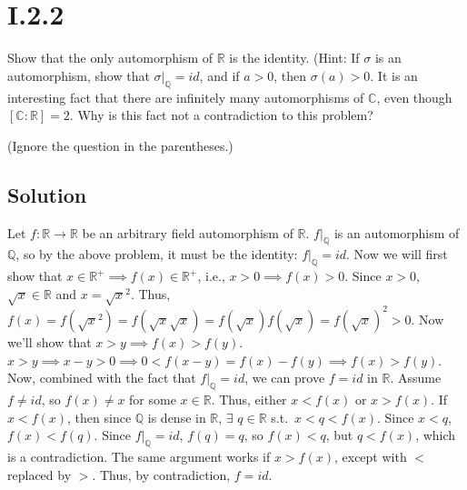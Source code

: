 \documentclass[fleqn]{article}
\begin{document}
    \section{I.2.2}
    Show that the only automorphism of $\mathbb{R}$ is the identity.  (Hint: If $\sigma$ is an automorphism, show that $\sigma \rvert_\mathbb{Q} = id$, and if $a > 0$, then $\sigma(a) > 0$.  It is an interesting fact that there are infinitely many automorphisms of $\mathbb{C}$, even though $[\mathbb{C} : \mathbb{R}] = 2$.  Why is this fact not a contradiction to this problem?
    
    (Ignore the question in the parentheses.)
        
        \subsection{Solution}
        Let $f: \mathbb{R} \to \mathbb{R}$ be an arbitrary field automorphism of $\mathbb{R}$.  $f \rvert_\mathbb{Q}$ is an automorphism of $\mathbb{Q}$, so by the above problem, it must be the identity: $f \rvert_\mathbb{Q} = id$.  Now we will first show that $x \in \mathbb{R}^+ \implies f(x) \in \mathbb{R}^+$, i.e., $x > 0 \implies f(x) > 0$.  Since $x > 0$, $\sqrt{x} \in \mathbb{R}$ and $x = \sqrt{x}^2$.  Thus, $f(x) = f\left(\sqrt{x}^2\right) = f(\sqrt{x}\sqrt{x}) = f(\sqrt{x})f(\sqrt{x}) = f(\sqrt{x})^2 > 0$.  Now we'll show that $x > y \implies f(x) > f(y)$.  $x > y \implies x - y > 0 \implies 0 < f(x - y) = f(x) - f(y) \implies f(x) > f(y)$.  Now, combined with the fact that $f \rvert_\mathbb{Q} = id$, we can prove $f = id$ in $\mathbb{R}$.  Assume $f \neq id$, so $f(x) \neq x$ for some $x \in \mathbb{R}$.  Thus, either $x < f(x)$ or $x > f(x)$.  If $x < f(x)$, then since $\mathbb{Q}$ is dense in $\mathbb{R}$, $\exists$ $q \in \mathbb{R}$ s.t.\ $x < q < f(x)$.  Since $x < q$, $f(x) < f(q)$.  Since $f \rvert_\mathbb{Q} = id$, $f(q) = q$, so $f(x) < q$, but $q < f(x)$, which is a contradiction.  The same argument works if $x > f(x)$, except with $<$ replaced by $>$.  Thus, by contradiction, $f = id$.
    
\end{document}
